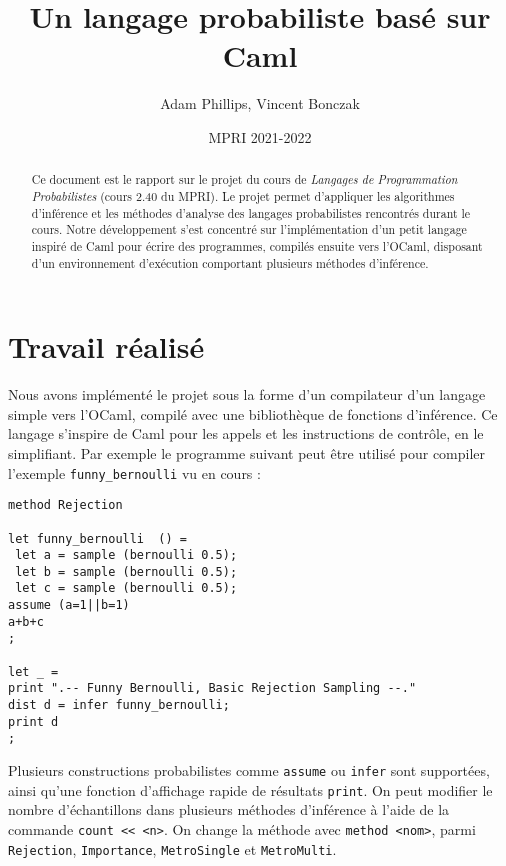\documentclass[svgnames]{article}
\begin{document}
\title{Un langage probabiliste basé sur Caml}

\author{Adam Phillips, Vincent Bonczak}

\date{MPRI 2021-2022}

\maketitle

\begin{abstract}
Ce document est le rapport sur le projet du cours de \emph{Langages de Programmation Probabilistes} (cours 2.40 du MPRI). 
Le projet permet d'appliquer les algorithmes d'inférence et les méthodes d'analyse des langages probabilistes rencontrés durant le cours. 
Notre développement s'est concentré sur l'implémentation d'un petit langage inspiré de Caml pour écrire des programmes, compilés ensuite vers
l'OCaml, disposant d'un environnement  d'exécution comportant plusieurs méthodes d'inférence.
\end{abstract}

\section{Travail réalisé}

Nous avons implémenté le projet sous la forme d'un compilateur d'un langage simple vers l'OCaml, compilé avec une bibliothèque de fonctions d'inférence.
Ce langage s'inspire de Caml pour les appels et les instructions de contrôle, en le simplifiant. Par exemple le programme suivant peut être utilisé pour compiler l'exemple \verb|funny_bernoulli| vu en cours :
\begin{lstlisting}
method Rejection

let funny_bernoulli  () =  
 let a = sample (bernoulli 0.5);
 let b = sample (bernoulli 0.5);  
 let c = sample (bernoulli 0.5); 
assume (a=1||b=1)
a+b+c
;

let _ = 
print ".-- Funny Bernoulli, Basic Rejection Sampling --."
dist d = infer funny_bernoulli;
print d
;
\end{lstlisting}

 
Plusieurs constructions probabilistes comme \verb|assume| ou \verb|infer| sont supportées, ainsi qu'une fonction d'affichage rapide de résultats \verb|print|.
On peut modifier le nombre d'échantillons dans plusieurs méthodes d'inférence à l'aide de la commande \lstinline|count << <n>|.
On change la méthode avec \lstinline|method <nom>|, parmi  \verb|Rejection|, \verb|Importance|, \verb|MetroSingle| et \verb|MetroMulti|.
\end{document}
